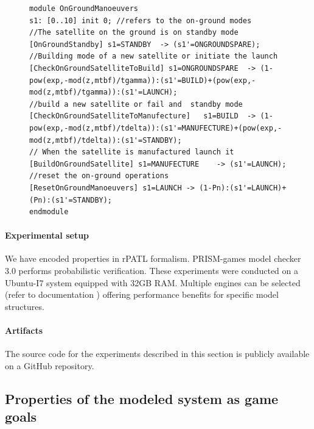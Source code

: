 \begin{figure}[!htb]            
\begin{minipage}{9cm}
\begin{lstlisting}[style=framed,%customc,
	caption=On-Ground Satellite Manoeuvers,
 	label=CSGSatteliteModelOnGroundManoeuvers]	
module OnGroundManoeuvers
s1: [0..10] init 0; //refers to the on-ground modes
//The satellite on the ground is on standby mode
[OnGroundStandby] s1=STANDBY  -> (s1'=ONGROUNDSPARE);
//Building mode of a new satellite or initiate the launch
[CheckOnGroundSatelliteToBuild] s1=ONGROUNDSPARE  -> (1-pow(exp,-mod(z,mtbf)/tgamma)):(s1'=BUILD)+(pow(exp,-mod(z,mtbf)/tgamma)):(s1'=LAUNCH);
//build a new satellite or fail and  standby mode
[CheckOnGroundSatelliteToManufecture]   s1=BUILD  -> (1-pow(exp,-mod(z,mtbf)/tdelta)):(s1'=MANUFECTURE)+(pow(exp,-mod(z,mtbf)/tdelta)):(s1'=STANDBY);
// When the satellite is manufactured launch it
[BuildOnGroundSatellite] s1=MANUFECTURE    -> (s1'=LAUNCH);
//reset the on-ground operations
[ResetOnGroundManoeuvers] s1=LAUNCH -> (1-Pn):(s1'=LAUNCH)+(Pn):(s1'=STANDBY);
endmodule
\end{lstlisting}
 \end{minipage}  
\end{figure}

\paragraph{Experimental setup} We have encoded properties in rPATL formalism. PRISM-games model checker 3.0 \cite{Kwiatkowska2020} performs probabilistic verification. These experiments were conducted on a Ubuntu-I7 system equipped with 32GB RAM. Multiple engines can be selected (refer to documentation \cite{engines}) offering performance benefits for specific model structures. 

\paragraph{Artifacts} The source code for the experiments described in this section is publicly available on a GitHub repository\cite{seaa2024}. %


\subsection{Properties of the modeled system as game goals}


